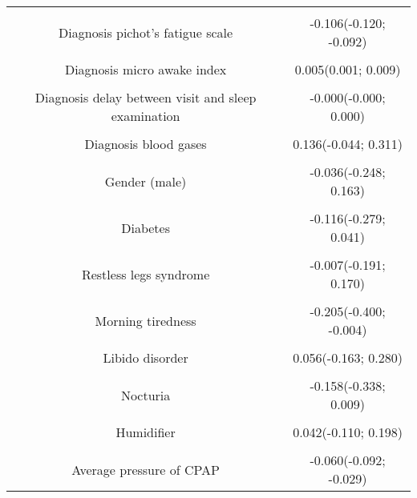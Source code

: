 \documentclass{article}
\begin{document}
\begin{longtable}[t]{cc}
\cellcolor{gray!6}{Diagnosis epworth sleepiness scale} & \cellcolor{gray!6}{0.347(0.326; 0.365)}\\
Diagnosis pichot's fatigue scale & -0.106(-0.120; -0.092)\\
\cellcolor{gray!6}{Diagnosis depression scale} & \cellcolor{gray!6}{-0.030(-0.056; -0.002)}\\
Diagnosis micro awake index & 0.005(0.001; 0.009)\\
\cellcolor{gray!6}{Diagnosis mean nocturnal SaO2} & \cellcolor{gray!6}{0.015(-0.004; 0.036)}\\
Diagnosis delay between visit and sleep examination & -0.000(-0.000; 0.000)\\
\cellcolor{gray!6}{Apnea Hypopnea Index at diagnosis} & \cellcolor{gray!6}{-0.018(-0.022; -0.013)}\\
Diagnosis blood gases & 0.136(-0.044; 0.311)\\
\cellcolor{gray!6}{Diagnosis spirometry} & \cellcolor{gray!6}{0.106(-0.055; 0.278)}\\
Gender (male) & -0.036(-0.248; 0.163)\\
\cellcolor{gray!6}{Hypertension} & \cellcolor{gray!6}{-0.009(-0.171; 0.146)}\\
Diabetes & -0.116(-0.279; 0.041)\\
\cellcolor{gray!6}{Hypercholesterolemia} & \cellcolor{gray!6}{-0.100(-0.248; 0.055)}\\
Restless legs syndrome & -0.007(-0.191; 0.170)\\
\cellcolor{gray!6}{Daytime sleepiness} & \cellcolor{gray!6}{1.081(0.897; 1.273)}\\
Morning tiredness & -0.205(-0.400; -0.004)\\
\cellcolor{gray!6}{Morning headaches} & \cellcolor{gray!6}{-0.184(-0.405; 0.035)}\\
Libido disorder & 0.056(-0.163; 0.280)\\
\cellcolor{gray!6}{Night sweating} & \cellcolor{gray!6}{0.230(0.004; 0.445)}\\
Nocturia & -0.158(-0.338; 0.009)\\
\cellcolor{gray!6}{Pichot's fatigue scale} & \cellcolor{gray!6}{0.327(0.312; 0.343)}\\
Humidifier & 0.042(-0.110; 0.198)\\
\cellcolor{gray!6}{Residual apnea  hypopnea index under CPAP} & \cellcolor{gray!6}{0.042(0.023; 0.060)}\\
Average pressure of CPAP & -0.060(-0.092; -0.029)\\

\end{longtable}
\end{document}
